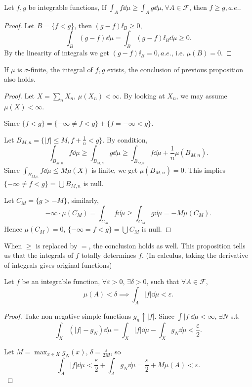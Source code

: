 \begin{proposition}
	Let $f,g$ be integrable functions,
	If $\int_A f\dd \mu \ge \int_A g\dd \mu, \forall A\in \mathscr{F}$,
	then $f\ge g, a.e.$.
\end{proposition}
\begin{proof}[Proof]
    Let $B = \{ f < g\}$, then $(g - f)\ii_B \ge 0$,
	\[
	\int_B (g - f)\dd \mu = \int_B (g - f)\ii_B \dd \mu \ge 0.
	\]
	By the linearity of integrals we get $(g - f)\ii_B = 0, a.e.$,
	i.e. $\mu(B) = 0$.
\end{proof}

\begin{proposition}
	If $\mu$ is $\sigma$-finite, the integral of $f,g$ exists,
	the conclusion of previous proposition also holds.
\end{proposition}
\begin{proof}[Proof]
    Let $X = \sum_{n} X_n$, $\mu(X_n) < \infty$. By looking at $X_n$,
	we may assume $\mu(X) < \infty$.

	Since $\{ f < g \} = \{-\infty \ne f < g\} + \{f = -\infty < g\}$.

	Let $B_{M, n} = \{|f|\le M, f + \frac{1}{n} < g\}$.
	By condition,
	\[
	\int_{B_{M,n}} f\dd \mu \ge \int_{B_{M,n}} g\dd \mu \ge
	\int_{B_{M,n}} f\dd \mu + \frac{1}{n}\mu(B_{M,n}).
	\]
	Since $\int_{B_{M,n}} f\dd \mu \le M\mu(X)$ is finite, we get $\mu(B_{M,n}) = 0$.
	This implies $\{-\infty \ne f < g\} = \bigcup B_{M,n}$ is null.

	Let $C_M = \{g > -M\}$, similarly,
	\[
	-\infty\cdot\mu(C_M) = \int_{C_M}f \dd \mu \ge\int_{C_M} g\dd \mu = -M \mu(C_M).
	\]
	Hence $\mu(C_M) = 0$, $\{-\infty = f < g\} = \bigcup C_M$ is null.
\end{proof}

\begin{remark}
	When $\ge$ is replaced by $=$, the conclusion holds as well.
    This proposition tells us that the integrals of $f$ totally determines $f$.
	(In calculus, taking the derivative of integrals gives original functions)
\end{remark}

\begin{theorem}
    Let $f$ be an integrable function, $\forall \varepsilon>0$, $\exists \delta>0$,
	such that $\forall A\in \mathscr{F}$,
	\[
	\mu(A) < \delta \implies \int_A |f|\dd \mu < \varepsilon.
	\]
\end{theorem}
\begin{proof}[Proof]
Take non-negative simple functions $g_n \uparrow |f|$.
Since $\int |f|\dd \mu < \infty$, $\exists N$ s.t.
\[
\int_X (|f| - g_N)\dd \mu = \int_X |f|\dd \mu - \int_X g_N \dd\mu < \frac{\varepsilon}{2}.
\]

Let $M = \max_{x\in X} g_N(x)$, $\delta = \frac{\varepsilon}{2M}$, so
\[
\int_A |f|\dd \mu < \frac{\varepsilon}{2} + \int_A g_N \dd \mu = \frac{\varepsilon}{2}
+ M\mu(A) < \varepsilon.
\]
\end{proof}

